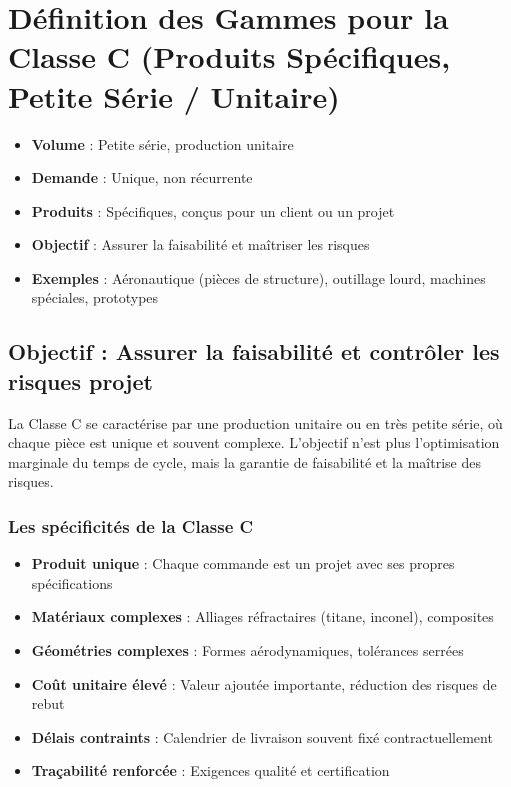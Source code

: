 \documentclass{article}
\begin{document}
\section{Définition des Gammes pour la Classe C (Produits Spécifiques, Petite Série / Unitaire)}

\begin{tcolorbox}[colback=blueclair, colframe=blue!70!black, title=Caractéristiques de la Classe C]
\begin{itemize}
    \item \textbf{Volume} : Petite série, production unitaire
    \item \textbf{Demande} : Unique, non récurrente
    \item \textbf{Produits} : Spécifiques, conçus pour un client ou un projet
    \item \textbf{Objectif} : Assurer la faisabilité et maîtriser les risques
    \item \textbf{Exemples} : Aéronautique (pièces de structure), outillage lourd, machines spéciales, prototypes
\end{itemize}
\end{tcolorbox}

\subsection{Objectif : Assurer la faisabilité et contrôler les risques projet}

La Classe C se caractérise par une production unitaire ou en très petite série, où chaque pièce est unique et souvent complexe. L'objectif n'est plus l'optimisation marginale du temps de cycle, mais la garantie de faisabilité et la maîtrise des risques.

\subsubsection{Les spécificités de la Classe C}

\begin{itemize}
    \item \textbf{Produit unique} : Chaque commande est un projet avec ses propres spécifications
    \item \textbf{Matériaux complexes} : Alliages réfractaires (titane, inconel), composites
    \item \textbf{Géométries complexes} : Formes aérodynamiques, tolérances serrées
    \item \textbf{Coût unitaire élevé} : Valeur ajoutée importante, réduction des risques de rebut
    \item \textbf{Délais contraints} : Calendrier de livraison souvent fixé contractuellement
    \item \textbf{Traçabilité renforcée} : Exigences qualité et certification
\end{itemize}
\end{document}
